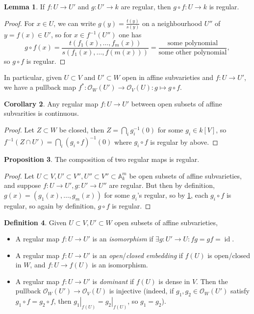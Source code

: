 \documentclass{article}
\newcommand{\A}{\mathbb{A}}
\newcommand{\id}{\operatorname{id}}
\theoremstyle{definition}
\newtheorem{defn}{Definition}[subsection]
\newtheorem{prop}[defn]{Proposition}
\newtheorem{lemma}[defn]{Lemma}
\newtheorem{coro}[defn]{Corollary}
\begin{document}
\begin{lemma}
\label{lemma:regmapfunccompisreg}
If $f:U\rightarrow U'$ and $g:U'\rightarrow k$ are regular, then $g\circ f:U\rightarrow k$ is regular. 
\end{lemma}
\begin{proof}
For $x\in U$, we can write $g(y)=\frac{t(y)}{s(y)}$ on a neighbourhood $U''$ of $y=f(x)\in U'$, so for $x\in f^{-1}(U'')$ one has
\[
g\circ f(x)=\frac{t(f_1(x),\ldots,f_m(x))}{s(f_1(x),\ldots,f(m(x)))}=\frac{\text{some polynomial}}{\text{some other polynomial}},
\]
so $g\circ f$ is regular.
\end{proof}

In particular, given $U\subset V$ and $U'\subset W$ open in affine subvarieties and $f:U\rightarrow U'$, we have a pullback map $f^\ast:\mathcal O_W(U')\rightarrow\mathcal O_V(U):g\mapsto g\circ f$.

\begin{coro}
Any regular map $f:U\rightarrow U'$ between open subsets of affine subvarities is continuous.
\end{coro}
\begin{proof}
Let $Z\subset W$ be closed, then $Z=\bigcap_i g_i^{-1}(0)$ for some $g_i\in k[V]$, so $f^{-1}(Z\cap U')=\bigcap_i(g_i\circ f)^{-1}(0)$ where $g_i\circ f$ is regular by above.
\end{proof}

\begin{prop}
The composition of two regular maps is regular.
\end{prop}
\begin{proof}
Let $U\subset V,U'\subset V'',U''\subset V''\subset\A_k^m$ be open subsets of affine subvarieties, and suppose $f:U\rightarrow U',g:U'\rightarrow U''$ are regular. But then by definition, $g(x)=(g_1(x),\ldots,g_m(x))$ for some $g_i$'s regular, so by \ref{lemma:regmapfunccompisreg}, each $g_i\circ f$ is regular, so again by definition, $g\circ f$ is regular.
\end{proof}

\begin{defn}
\label{defn:isoembdomin}
Given $U\subset V,U'\subset W$ open subsets of affine subvarieties,

\begin{itemize}
\item A regular map $f:U\rightarrow U'$ is an \textit{isomorphism} if $\exists g:U'\rightarrow U:fg=gf=\id$.
\item A regular map $f:U\rightarrow U'$ is an \textit{open}/\textit{closed embedding} if $f(U)$ is open/closed in $W$, and $f:U\rightarrow f(U)$ is an isomorphism.
\item A regular map $f:U\rightarrow U'$ is \textit{dominant} if $f(U)$ is dense in $V$. Then the pullback $\mathcal O_W(U')\rightarrow\mathcal O_V(U)$ is injective (indeed, if $g_1,g_2\in\mathcal O_W(U')$ satisfy $g_1\circ f=g_2\circ f$, then $\left. g_1\right|_{f(U)}=\left. g_2\right|_{f(U)}$, so $g_1=g_2$). 
\end{itemize}
\end{defn}
\end{document}

